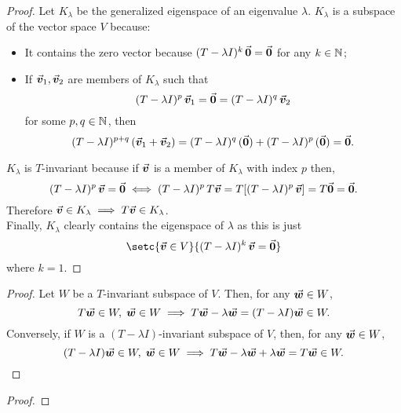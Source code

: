 \documentclass[../MathsNotesBase.tex]{subfiles}
\begin{document}
{		\bigskip
		\begin{proof}
			Let $K_\lambda$ be the generalized eigenspace of an eigenvalue $\lambda$. $K_\lambda$ is a subspace of the vector space $V$ because:
			\begin{itemize}
				\item{It contains the zero vector because ${ (T- \lambda I)^k \, \vec{\bm{0}} = \vec{\bm{0}} }$ for any ${ k \in \mathbb{N}^{} }$;}
				\item{If $\vec{\bm{v}}_1,\vec{\bm{v}}_2$ are members of $K_\lambda$ such that
					\[ (T- \lambda I)^p \, \vec{\bm{v}}_1 = \vec{\bm{0}} = (T- \lambda I)^q \, \vec{\bm{v}}_2 \]
					for some ${ p,q \in \mathbb{N}^{} }$, then
					\[ (T- \lambda I)^{p+q} \, (\vec{\bm{v}}_1 + \vec{\bm{v}}_2) = (T- \lambda I)^q \, (\vec{\bm{0}}) + (T- \lambda I)^p \, (\vec{\bm{0}}) = \vec{\bm{0}}. \]
				}
			\end{itemize}
			$K_\lambda$ is $T$-invariant because if $\vec{\bm{v}}$ is a member of $K_\lambda$ with index $p$ then,
			\[ (T- \lambda I)^p \, \vec{\bm{v}} = \vec{\bm{0}} \iff (T- \lambda I)^p \, T\vec{\bm{v}} = T[(T- \lambda I)^p \, \vec{\bm{v}}] = T\vec{\bm{0}} = \vec{\bm{0}}. \]
			Therefore ${ \vec{\bm{v}} \in K_\lambda \implies T\vec{\bm{v}} \in K_\lambda }$.\\
			
			Finally, $K_\lambda$ clearly contains the eigenspace of $\lambda$ as this is just
			\[ \setc{\v \in V}{(T- \lambda I)^k \, \v = \0} \]
			where ${ k = 1 }$.
		\end{proof}
	
		\bigskip
		\begin{proof}
			Let $W$ be a $T$-invariant subspace of $V$. Then, for any ${ \vec{\bm{w}} \in W }$,
			\[ T\vec{\bm{w}} \in W, \; \vec{\bm{w}} \in W \implies T\vec{\bm{w}} - \lambda \vec{\bm{w}} = (T - \lambda I)\vec{\bm{w}} \in W.  \]
			Conversely, if $W$ is a $(T - \lambda I)$-invariant subspace of $V$, then, for any ${ \vec{\bm{w}} \in W }$,
			\[ (T - \lambda I)\vec{\bm{w}} \in W, \; \vec{\bm{w}} \in W \implies T\vec{\bm{w}} - \lambda \vec{\bm{w}} + \lambda \vec{\bm{w}} = T\vec{\bm{w}} \in W. \]
		\end{proof}
	
		\bigskip
		\begin{proof}
		\end{proof}
	
}
\end{document}

